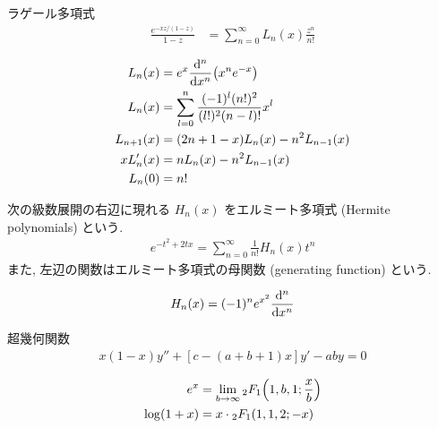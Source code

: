 \documentclass[uplatex,dvipdfmx,a4paper,11pt]{jlreq}
\theoremstyle{definition}
\begin{document}
\begin{definition}
  ラゲール多項式
  \begin{align}
    \frac{e^{-xz/(1-z)}}{1-z} & = \sum_{n=0}^{\infty}L_n(x)\frac{z^n}{n!}
  \end{align}
\end{definition}
\begin{proposition}
  \begin{align}
    L_n(x)     & = e^x\dv[n]{x}(x^ne^{-x})                            \\
    L_n(x)     & = \sum_{l=0}^{n}\frac{(-1)^l(n!)^2}{(l!)^2(n-l)!}x^l \\
    L_{n+1}(x) & = (2n + 1 - x)L_n(x) - n^2L_{n-1}(x)                 \\
    xL_n'(x)   & = nL_n(x) - n^2L_{n-1}(x)                            \\
    L_n(0)     & = n!
  \end{align}
\end{proposition}

\begin{definition}
  次の級数展開の右辺に現れる $H_n(x)$ をエルミート多項式 (Hermite polynomials) という.
  \begin{align}
    e^{-t^2 + 2tx} = \sum_{n=0}^{\infty}\frac{1}{n!}H_n(x)t^n
  \end{align}
  また, 左辺の関数はエルミート多項式の母関数 (generating function) という.
\end{definition}
\begin{proposition}
  \begin{align}
    H_n(x) = (-1)^ne^{x^2}\dv[n]{x}
  \end{align}
\end{proposition}

\begin{definition}
  超幾何関数
  \begin{align}
    x(1 - x)y'' + [c - (a + b + 1)x]y' - aby = 0
  \end{align}
\end{definition}
\begin{proposition}
  \begin{align}
    e^x         & = \lim_{b\to\infty}{}_2F_1\qty(1,b,1;\frac{x}{b}) \\
    \log(1 + x) & = x\cdot{}_2F_1(1,1,2;-x)
  \end{align}
\end{proposition}
\end{document}

